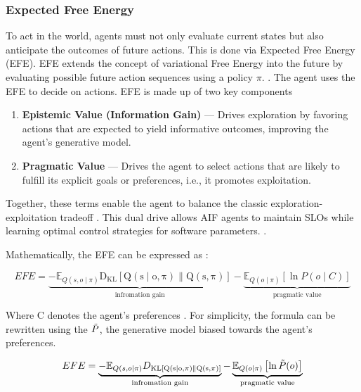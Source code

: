 

 \subsubsection{Expected Free Energy}
To act in the world, agents must not only evaluate current states but also anticipate the outcomes of future actions. This is done via Expected Free Energy (EFE). EFE extends the concept of variational Free Energy into the future by evaluating possible future action sequences using a policy \(\pi\). \cite{friston_active_2016}. The agent uses the EFE to decide on actions. EFE is made up of two key components \cite{friston_active_2022} %
\begin{enumerate}
  \item \textbf{Epistemic Value (Information Gain)} — Drives exploration by favoring actions that are expected to yield informative outcomes, improving the agent’s generative model.
  \item \textbf{Pragmatic Value} — Drives the agent to select actions that are likely to fulfill its explicit goals or preferences, i.e., it promotes exploitation.
\end{enumerate}

Together, these terms enable the agent to balance the classic exploration-exploitation tradeoff \cite{sedlak_adaptive_2024}. This dual drive allows AIF
agents to maintain SLOs while learning optimal control strategies for software parameters. \cite{lapkovskis_benchmarking_2025}.

Mathematically, the EFE can be expressed as \cite{parr_active_2022}:

\[
EFE=\underbrace{-\mathbb{E}_{Q(s, o \mid \pi)} \mathrm{D_{KL} \left[ Q(s \mid o, \pi) \parallel Q(s, \pi) \right] }}_{\text{infromation gain}} - \underbrace{\mathbb{E}_{Q(o \mid \pi)} \left[ \ln P(o \mid C) \right]}_{\text{pragmatic value}}
\]

Where C denotes the agent's preferences \cite{parr_active_2022}. For simplicity, the formula can be rewritten using the \(\Tilde{P}\), the generative model biased towards the agent's preferences.

\[
EFE=\underbrace{-\mathbb{E}_{Q(s, o \mid \pi)} D_\mathrm{{KL} \left[ Q(s \mid o, \pi) \parallel Q(s, \pi) \right] }}_{\text{infromation gain}} - \underbrace{\mathbb{E}_{Q(o \mid \pi)} \left[ \ln \Tilde{P}(o) \right]}_{\text{pragmatic value}}
\]




